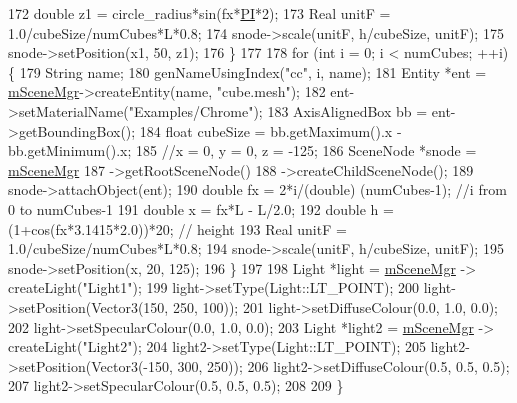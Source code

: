 \begin{DoxyCode}
172         \textcolor{keywordtype}{double} z1 = circle\_radius*sin(fx*\hyperlink{_tutorial_application_8cpp_aa08a577393243b86dfd2a97e61443673}{PI}*2);
173         Real unitF = 1.0/cubeSize/numCubes*L*0.8;
174         snode->scale(unitF, h/cubeSize, unitF);
175         snode->setPosition(x1, 50, z1);
176     \} 
177 
178     \textcolor{keywordflow}{for} (\textcolor{keywordtype}{int} i = 0; i < numCubes; ++i) \{
179         String name;
180         genNameUsingIndex(\textcolor{stringliteral}{"cc"}, i, name);
181         Entity *ent = \hyperlink{class_base_application_a8a7684f4f9a57ed3089048ad1a913b2d}{mSceneMgr}->createEntity(name, \textcolor{stringliteral}{"cube.mesh"});
182         ent->setMaterialName(\textcolor{stringliteral}{"Examples/Chrome"});
183         AxisAlignedBox bb = ent->getBoundingBox();
184         \textcolor{keywordtype}{float} cubeSize = bb.getMaximum().x - bb.getMinimum().x;
185         \textcolor{comment}{//x = 0, y = 0, z = -125;}
186         SceneNode *snode = \hyperlink{class_base_application_a8a7684f4f9a57ed3089048ad1a913b2d}{mSceneMgr}
187         ->getRootSceneNode()
188         ->createChildSceneNode();
189         snode->attachObject(ent);
190         \textcolor{keywordtype}{double} fx = 2*i/(double) (numCubes-1); \textcolor{comment}{//i from 0 to numCubes-1}
191         \textcolor{keywordtype}{double} x = fx*L - L/2.0;
192         \textcolor{keywordtype}{double} h = (1+cos(fx*3.1415*2.0))*20; \textcolor{comment}{// height}
193         Real unitF = 1.0/cubeSize/numCubes*L*0.8;
194         snode->scale(unitF, h/cubeSize, unitF);
195         snode->setPosition(x, 20, 125);
196     \} 
197 
198     Light *light = \hyperlink{class_base_application_a8a7684f4f9a57ed3089048ad1a913b2d}{mSceneMgr} -> createLight(\textcolor{stringliteral}{"Light1"});
199     light->setType(Light::LT\_POINT);
200     light->setPosition(Vector3(150, 250, 100));
201     light->setDiffuseColour(0.0, 1.0, 0.0);
202     light->setSpecularColour(0.0, 1.0, 0.0);
203     Light *light2 = \hyperlink{class_base_application_a8a7684f4f9a57ed3089048ad1a913b2d}{mSceneMgr} -> createLight(\textcolor{stringliteral}{"Light2"});
204     light2->setType(Light::LT\_POINT);
205     light2->setPosition(Vector3(-150, 300, 250));
206     light2->setDiffuseColour(0.5, 0.5, 0.5);
207     light2->setSpecularColour(0.5, 0.5, 0.5);
208 
209 \}
\end{DoxyCode}
\mbox{\label{class_basic_tutorial__00_aad14e1ca565797c4b7dcff31bc0e1494}} 
